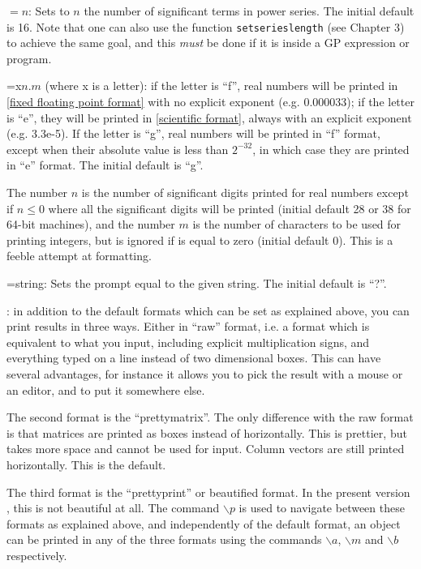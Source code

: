 \subsec{$\backslash$\ref{serieslength}}$=n$:
Sets to $n$ the number of significant terms in power series. The initial
default is 16. Note that one can also use the function {\tt setserieslength}
(see Chapter 3) to achieve the same goal, and this {\sl must} be done if it 
is inside a GP expression or program.

\subsec{$\backslash$\ref{format}}=x$n.m$ (where x is a letter): if the letter
is ``f'', real
numbers will be printed in \ref{fixed floating point format} with no explicit
exponent (e.g. 0.000033); if the letter is ``e'', they will be printed
in \ref{scientific format}, always with an explicit exponent (e.g. 3.3e-5).
If the letter is ``g'', real numbers will be printed in ``f'' format,
except when their absolute value is less than $2^{-32}$, in which case
they are printed in ``e'' format. The initial default is ``g''.

The number $n$ is the number of significant digits printed for real numbers
except if $n\le0$ where all the significant digits will be printed
(initial default 28 or 38 for 64-bit machines), and the number $m$ is the
number of characters to be
used for printing integers, but is ignored if is equal to zero (initial
default 0). This is a feeble attempt at formatting.

\subsec{$\backslash$\ref{prompt}}=string:
Sets the prompt equal to the given string. The initial default is ``?''.

: in addition to the default
formats which can be set as explained above, you can print results in three 
ways. Either in ``raw'' format, i.e. a format which is 
equivalent to what you input, including
explicit multiplication signs, and everything typed on a line instead of
two dimensional boxes. This can have several advantages, for instance it
allows you to pick the result with a mouse or an editor, and to put it
somewhere else.

The second format is the ``prettymatrix''. The only
difference with the raw format is that matrices are printed as boxes instead of
horizontally. This is prettier, but takes more space and cannot be used for
input. Column vectors are still printed horizontally. This is the default.

The third format is the ``prettyprint'' or beautified
format. In the present version \vers, this is not beautiful at all. The command
$\backslash p$ is used to navigate between these formats as explained above,
and independently of the default format, an object can be printed in any of the
three formats using the commands $\backslash a$, $\backslash m$ and 
$\backslash b$ respectively.

